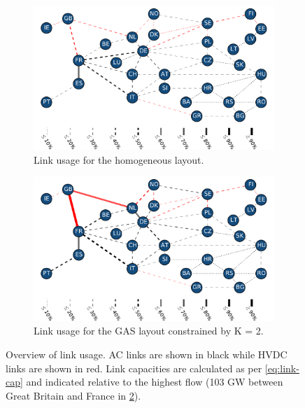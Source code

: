 \documentclass[a4paper, 5p, sort&compress]{elsarticle}%
\begin{document}
\begin{figure}[t!]
  \centering
  \begin{subfigure}{1\columnwidth}
    \includegraphics[width = \columnwidth, center]{links-homogeneous}
    \caption{Link usage for the homogeneous layout.}
    \label{fig:links-homo}    
  \end{subfigure}
  \begin{subfigure}{1\columnwidth}
    \includegraphics[width = \columnwidth, center]{links-gas-k=2}
    \caption{Link usage for the GAS layout constrained by K = 2.}
    \label{fig:links-k2}    
  \end{subfigure}
  \caption{Overview of link usage. AC links are shown in black while
    HVDC links are shown in red. Link capacities are calculated as per
    \cref{eq:link-cap} and indicated relative to the highest flow (103 GW
    between Great Britain and France in \cref{fig:links-k2}).}
  \label{fig:links}
\end{figure}
\end{document}
